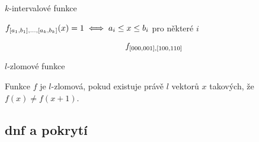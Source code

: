 \documentclass{beamer}
\theoremstyle{remark}
\begin{document}
\begin{frame}{$k$-intervalové funkce}

\begin{definition}
$f_{[a_1, b_1], \ldots, [a_k, b_k]}(x) = 1 \iff a_i \leq x \leq b_i$ pro některé $i$
\end{definition}

\begin{example}
$$f_{[000, 001], [100, 110]}$$

\begin{figure}[h]
\centering

\end{figure}
\end{example}
\end{frame}

\begin{frame}{$l$-zlomové funkce}
\begin{definition}
Funkce $f$ je $l$-zlomová,
pokud existuje právě $l$ vektorů $x$ takových,
že $f(x) \neq f(x+1)$.
\end{definition}

\begin{example}
\begin{figure}[h]
\centering

\end{figure}
\end{example}

\begin{example}
\begin{figure}[h]
\centering

\end{figure}
\end{example}

\end{frame}

\subsection{\Acrlong{dnf} a pokrytí}
\end{document}
